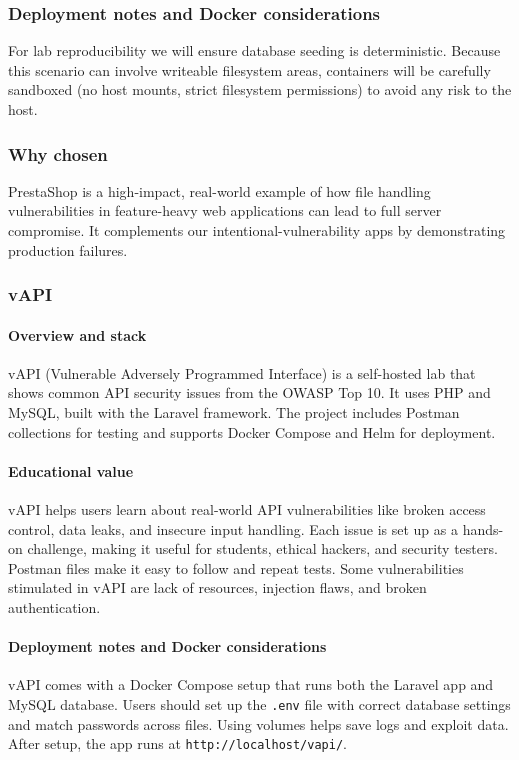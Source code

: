 \documentclass[12pt]{article}
\begin{document}
\subsubsection*{Deployment notes and Docker considerations}
For lab reproducibility we will ensure database seeding is deterministic. Because this scenario can involve writeable filesystem areas, containers will be carefully sandboxed (no host mounts, strict filesystem permissions) to avoid any risk to the host.

\subsubsection*{Why chosen}
PrestaShop is a high-impact, real-world example of how file handling vulnerabilities in feature-heavy web applications can lead to full server compromise. It complements our intentional-vulnerability apps by demonstrating production failures.

\subsubsection{vAPI}

\paragraph{Overview and stack}
vAPI (Vulnerable Adversely Programmed Interface) is a self-hosted lab that shows common API security issues from the OWASP Top 10. It uses PHP and MySQL, built with the Laravel framework. The project includes Postman collections for testing and supports Docker Compose and Helm for deployment.

\paragraph{Educational value}
vAPI helps users learn about real-world API vulnerabilities like broken access control, data leaks, and insecure input handling. Each issue is set up as a hands-on challenge, making it useful for students, ethical hackers, and security testers. Postman files make it easy to follow and repeat tests. Some vulnerabilities stimulated in vAPI are lack of resources, injection flaws, and broken authentication.

\paragraph{Deployment notes and Docker considerations}
vAPI comes with a Docker Compose setup that runs both the Laravel app and MySQL database. Users should set up the \texttt{.env} file with correct database settings and match passwords across files. Using volumes helps save logs and exploit data. After setup, the app runs at \texttt{http://localhost/vapi/}.
\end{document}

